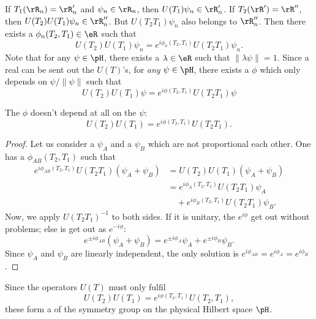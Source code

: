If $T_1(\rR_n)=\rR_n'$ and $\psi_n\in\rR_n$, then $U(T_1)\psi_n\in\rR_n'$. If $T_2(\rR')=\rR''$, then $U(T_2)U(T_1)\psi_n\in\rR_n''$. But $U(T_2T_1)\psi_n$ also belongs to $\rR_n''$. Then there exists a $\phi_n(T_2,T_1)\in\eR$ such that 
\[
   U(T_2)U(T_1)\psi_n=e^{i\phi_n(T_2,T_1)}U(T_2T_1)\psi_n.
\]
Note that for any $\psi\in \pH$, there exists a $\lambda\in\eR$ such that $\|\lambda\psi\|=1$. Since a real can be sent out the $U(T)$'s, for \emph{any} $\psi\in \pH$, there exists a $\phi$ which only depends on $\psi/\|\psi\|$ such that
\begin{equation}
    U(T_2)U(T_1)\psi=e^{i\phi(T_2,T_1)}U(T_2T_1)\psi
\end{equation}

\begin{proposition}
The $\phi$ doesn't depend at all on the $\psi$:
\begin{equation}
  U(T_2)U(T_1)=e^{i\phi(T_2,T_1)}U(T_2T_1).
\end{equation}
\end{proposition}

\begin{proof}
Let us consider a $\psi_A$ and a $\psi_B$ which are not proportional each other. One has a $\phi_{AB}(T_2,T_1)$ such that
\begin{equation}
\begin{split}
e^{i\phi_{AB}(T_2,T_1)}U(T_2T_1)(\psi_A+\psi_B)&=U(T_2)U(T_1)(\psi_A+\psi_B)\\
                                               &=e^{i\phi_A(T_2,T_1)}U(T_2T_1)\psi_A\\
                                               &\quad +e^{i\phi_B(T_2,T_1)}U(T_2T_1)\psi_B.
\end{split}
\end{equation}
Now, we apply $U(T_2T_1)^{-1}$ to both sides. If it is unitary, the $e^{i\phi}$ get out without problems; else is get out as $e^{-i\phi}$:
\begin{equation}
  e^{\pm i\phi_{AB}}(\psi_A+\psi_B)=e^{\pm i\phi_A}\psi_A+e^{\pm i\phi_B}\psi_B.
\end{equation}
Since $\psi_A$ and $\psi_B$ are linearly independent, the only solution is $e^{i\phi_{AB}}=e^{i\phi_A}=e^{i\phi_B}$.

\end{proof}

Since the operators $U(T)$ must only fulfil
\begin{equation}\label{eq:projectif}
   U(T_2)U(T_1)=e^{i\phi(T_2,T_1)}U(T_2,T_1),
\end{equation}
these form a  of the symmetry group on the physical Hilbert space $\pH$.

